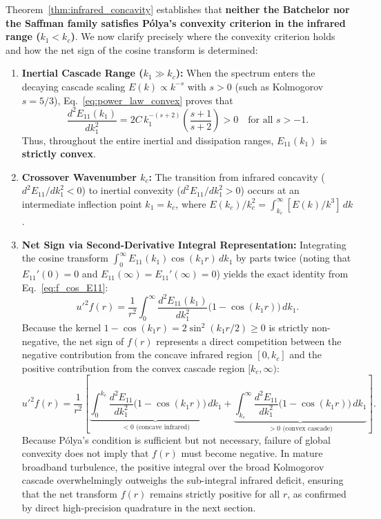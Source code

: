 \documentclass[lineno]{jfm}
\begin{document}
Theorem~\ref{thm:infrared_concavity} establishes that \textbf{neither the Batchelor nor the Saffman family satisfies P\'olya's convexity criterion in the infrared range ($k_1 < k_c$)}. We now clarify precisely where the convexity criterion holds and how the net sign of the cosine transform is determined:

\begin{enumerate}
\item \textbf{Inertial Cascade Range ($k_1 \gg k_c$):} When the spectrum enters the decaying cascade scaling $E(k) \propto k^{-s}$ with $s > 0$ (such as Kolmogorov $s = 5/3$), Eq.~\eqref{eq:power_law_convex} proves that
\begin{equation}
\frac{d^2 E_{11}(k_1)}{d k_1^2} = 2 C\,k_1^{-(s+2)} \left( \frac{s+1}{s+2} \right) > 0 \quad \text{for all } s > -1.
\end{equation}
Thus, throughout the entire inertial and dissipation ranges, $E_{11}(k_1)$ is \textbf{strictly convex}.

\item \textbf{Crossover Wavenumber $k_c$:} The transition from infrared concavity ($d^2 E_{11}/dk_1^2 < 0$) to inertial convexity ($d^2 E_{11}/dk_1^2 > 0$) occurs at an intermediate inflection point $k_1 = k_c$, where $E(k_c)/k_c^2 = \int_{k_c}^\infty [E(k)/k^3]\,dk$.

\item \textbf{Net Sign via Second-Derivative Integral Representation:} Integrating the cosine transform $\int_0^\infty E_{11}(k_1)\cos(k_1 r)\,dk_1$ by parts twice (noting that $E_{11}'(0) = 0$ and $E_{11}(\infty) = E_{11}'(\infty) = 0$) yields the exact identity from Eq.~\eqref{eq:f_cos_E11}:
\begin{equation}
u'^2 f(r) = \frac{1}{r^2} \int_0^\infty \frac{d^2 E_{11}(k_1)}{d k_1^2} \big(1 - \cos(k_1 r)\big)\,dk_1.
\label{eq:f_by_parts_second_deriv}
\end{equation}
Because the kernel $1 - \cos(k_1 r) = 2\sin^2(k_1 r / 2) \ge 0$ is strictly non-negative, the net sign of $f(r)$ represents a direct competition between the negative contribution from the concave infrared region $[0, k_c]$ and the positive contribution from the convex cascade region $[k_c, \infty)$:
\begin{equation}
u'^2 f(r) = \frac{1}{r^2} \left[ \underbrace{\int_0^{k_c} \frac{d^2 E_{11}}{dk_1^2} \big(1 - \cos(k_1 r)\big)\,dk_1}_{< 0 \text{ (concave infrared)}} + \underbrace{\int_{k_c}^\infty \frac{d^2 E_{11}}{dk_1^2} \big(1 - \cos(k_1 r)\big)\,dk_1}_{> 0 \text{ (convex cascade)}} \right].
\end{equation}
Because P\'olya's condition is sufficient but not necessary, failure of global convexity does not imply that $f(r)$ must become negative. In mature broadband turbulence, the positive integral over the broad Kolmogorov cascade overwhelmingly outweighs the sub-integral infrared deficit, ensuring that the net transform $f(r)$ remains strictly positive for all $r$, as confirmed by direct high-precision quadrature in the next section.
\end{enumerate}
\end{document}

